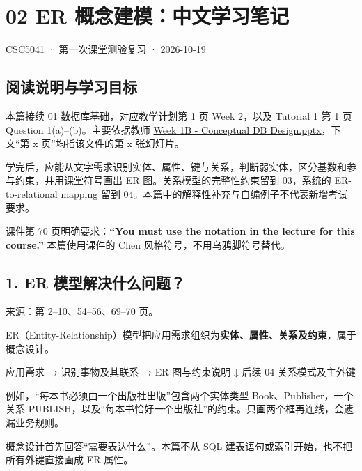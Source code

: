 \clearpage
\section{02 ER 概念建模：中文学习笔记}\label{02_er_modelling_zh}

CSC5041 · 第一次课堂测验复习 · 2026-10-19

\subsection{阅读说明与学习目标}\label{02_er_modelling_zh-ux9605ux8bfbux8bf4ux660eux4e0eux5b66ux4e60ux76eeux6807}

本篇接续 \hyperref[01_database_fundamentals_zh]{01 数据库基础}，对应教学计划第 1 页 Week 2，以及 Tutorial 1 第 1 页 Question 1(a)--(b)。主要依据教师 \href{../../../slides/Week\%201B\%20-\%20Conceptual\%20DB\%20Design.pptx}{Week 1B - Conceptual DB Design.pptx}，下文``第 x 页''均指该文件的第 x 张幻灯片。

学完后，应能从文字需求识别实体、属性、键与关系，判断弱实体，区分基数和参与约束，并用课堂符号画出 ER 图。关系模型的完整性约束留到 03，系统的 ER-to-relational mapping 留到 04。本篇中的解释性补充与自编例子不代表新增考试要求。

课件第 70 页明确要求：\textbf{``You must use the notation in the lecture for this course.''} 本篇使用课件的 Chen 风格符号，不用乌鸦脚符号替代。

\subsection{1. ER 模型解决什么问题？}\label{02_er_modelling_zh-er-ux6a21ux578bux89e3ux51b3ux4ec0ux4e48ux95eeux9898}

来源：第 2--10、54--56、69--70 页。

ER（Entity-Relationship）模型把应用需求组织为\textbf{实体、属性、关系及约束}，属于概念设计。

\begin{StudyCode}
应用需求 → 识别事物及其联系 → ER 图与约束说明
                                  ↓ 后续 04
                            关系模式及主外键
\end{StudyCode}

例如，``每本书必须由一个出版社出版''包含两个实体类型 Book、Publisher，一个关系 PUBLISH，以及``每本书恰好一个出版社''的约束。只画两个框再连线，会遗漏业务规则。

概念设计首先回答``需要表达什么''。本篇不从 SQL 建表语句或索引开始，也不把所有外键直接画成 ER 属性。

